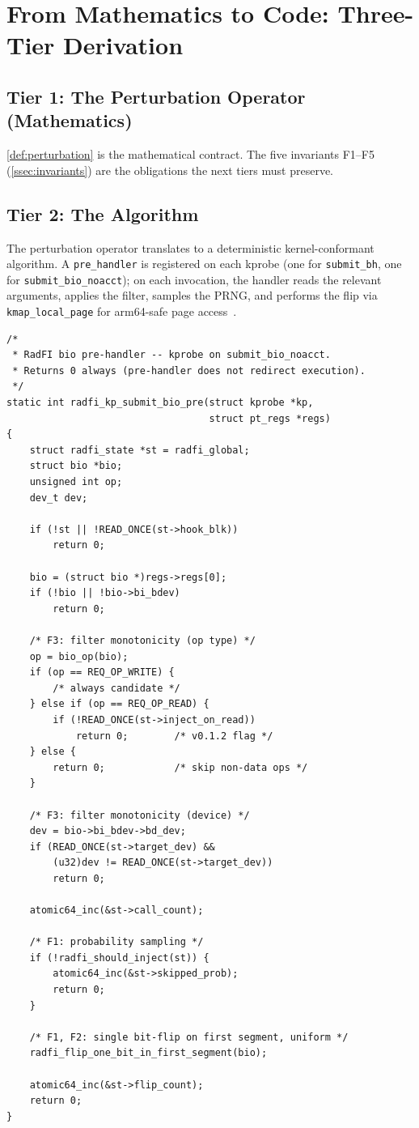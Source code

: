 \section{From Mathematics to Code: Three-Tier Derivation}\label{sec:m2c}

\subsection{Tier 1: The Perturbation Operator (Mathematics)}

\cref{def:perturbation} is the mathematical contract. The five
invariants F1--F5 (\cref{ssec:invariants}) are the obligations the
next tiers must preserve.

\subsection{Tier 2: The Algorithm}

The perturbation operator translates to a deterministic
kernel-conformant algorithm. A \texttt{pre\_handler} is registered on
each kprobe (one for \texttt{submit\_bh}, one for
\texttt{submit\_bio\_noacct}); on each invocation, the handler reads
the relevant arguments, applies the filter, samples the PRNG, and
performs the flip via \texttt{kmap\_local\_page} for arm64-safe page
access~\cite{kernel-highmem}.

\begin{lstlisting}[caption={RadFI bio pre-handler kprobe on
\texttt{submit\_bio\_noacct}.},label={lst:prehandler}]
/*
 * RadFI bio pre-handler -- kprobe on submit_bio_noacct.
 * Returns 0 always (pre-handler does not redirect execution).
 */
static int radfi_kp_submit_bio_pre(struct kprobe *kp,
                                   struct pt_regs *regs)
{
    struct radfi_state *st = radfi_global;
    struct bio *bio;
    unsigned int op;
    dev_t dev;

    if (!st || !READ_ONCE(st->hook_blk))
        return 0;

    bio = (struct bio *)regs->regs[0];
    if (!bio || !bio->bi_bdev)
        return 0;

    /* F3: filter monotonicity (op type) */
    op = bio_op(bio);
    if (op == REQ_OP_WRITE) {
        /* always candidate */
    } else if (op == REQ_OP_READ) {
        if (!READ_ONCE(st->inject_on_read))
            return 0;        /* v0.1.2 flag */
    } else {
        return 0;            /* skip non-data ops */
    }

    /* F3: filter monotonicity (device) */
    dev = bio->bi_bdev->bd_dev;
    if (READ_ONCE(st->target_dev) &&
        (u32)dev != READ_ONCE(st->target_dev))
        return 0;

    atomic64_inc(&st->call_count);

    /* F1: probability sampling */
    if (!radfi_should_inject(st)) {
        atomic64_inc(&st->skipped_prob);
        return 0;
    }

    /* F1, F2: single bit-flip on first segment, uniform */
    radfi_flip_one_bit_in_first_segment(bio);

    atomic64_inc(&st->flip_count);
    return 0;
}
\end{lstlisting}

